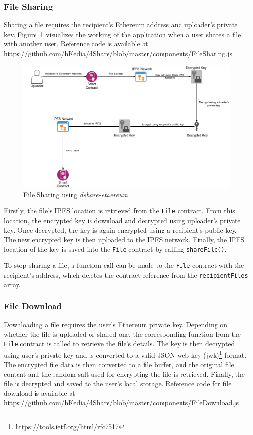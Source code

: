 \subsubsection{File Sharing}
Sharing a file requires the recipient's Ethereum address and uploader's private key. Figure~\ref{fig:ethereum-share} visualizes the working of the application when a user shares a file with another user. Reference code is available at \url{https://github.com/hKedia/dShare/blob/master/components/FileSharing.js}

\begin{figure}[h]
	\includegraphics[width=\linewidth]{figures/ethereum-share}
	\caption{\label{fig:ethereum-share} File Sharing using \textit{dshare-ethereum}}
\end{figure}

Firstly, the file's IPFS location is retrieved from the \texttt{File} contract. From this location, the encrypted key is download and decrypted using uploader's private key. Once decrypted, the key is again encrypted using a recipient's public key. The new encrypted key is then uploaded to the IPFS network. Finally, the IPFS location of the key is saved into the \texttt{File} contract by calling \texttt{shareFile()}.

To stop sharing a file, a function call can be made to the \texttt{File} contract with the recipient's address, which deletes the contract reference from the \texttt{recipientFiles} array.

\subsubsection{File Download}
Downloading a file requires the user's Ethereum private key. Depending on whether the file is uploaded or shared one, the corresponding function from the \texttt{File} contract is called to retrieve the file's details. The key is then decrypted using user's private key and is converted to a valid JSON web key (jwk)\footnote{\url{https://tools.ietf.org/html/rfc7517}} format. The encrypted file data is then converted to a file buffer, and the original file content and the random salt used for encrypting the file is retrieved. Finally, the file is decrypted and saved to the user's local storage. Reference code for file download is available at \url{https://github.com/hKedia/dShare/blob/master/components/FileDownload.js}

